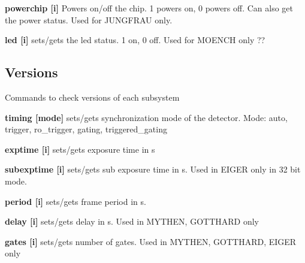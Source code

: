 \begin{DoxyItemize}
\item {\bfseries powerchip \mbox{[}i\mbox{]}} Powers on/off the chip. 1 powers on, 0 powers off. Can also get the power status. Used for JUNGFRAU only.
\end{DoxyItemize}


\begin{DoxyItemize}
\item {\bfseries led \mbox{[}i\mbox{]}} sets/gets the led status. 1 on, 0 off. Used for MOENCH only ??
\end{DoxyItemize}\hypertarget{config_versions}{}\subsection{Versions}\label{config_versions}
Commands to check versions of each subsystem


\begin{DoxyItemize}
\item {\bfseries timing \mbox{[}mode\mbox{]}} sets/gets synchronization mode of the detector. Mode: auto, trigger, ro\_\-trigger, gating, triggered\_\-gating
\end{DoxyItemize}


\begin{DoxyItemize}
\item {\bfseries exptime \mbox{[}i\mbox{]}} sets/gets exposure time in s
\end{DoxyItemize}


\begin{DoxyItemize}
\item {\bfseries subexptime \mbox{[}i\mbox{]}} sets/gets sub exposure time in s. Used in EIGER only in 32 bit mode.
\end{DoxyItemize}


\begin{DoxyItemize}
\item {\bfseries period \mbox{[}i\mbox{]}} sets/gets frame period in s.
\end{DoxyItemize}


\begin{DoxyItemize}
\item {\bfseries delay \mbox{[}i\mbox{]}} sets/gets delay in s. Used in MYTHEN, GOTTHARD only
\end{DoxyItemize}


\begin{DoxyItemize}
\item {\bfseries gates \mbox{[}i\mbox{]}} sets/gets number of gates. Used in MYTHEN, GOTTHARD, EIGER only
\end{DoxyItemize}


